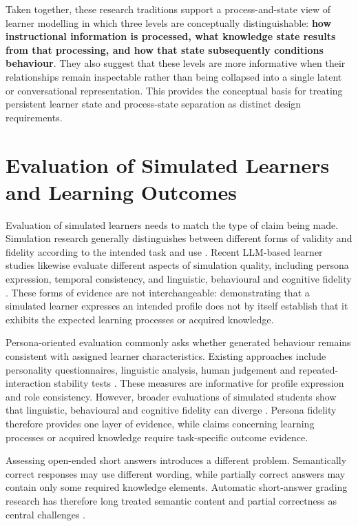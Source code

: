 Taken together, these research traditions support a process-and-state view of learner modelling in which three levels are conceptually distinguishable: \textbf{how instructional information is processed, what knowledge state results from that processing, and how that state subsequently conditions behaviour}. They also suggest that these levels are more informative when their relationships remain inspectable rather than being collapsed into a single latent or conversational representation. This provides the conceptual basis for treating persistent learner state and process-state separation as distinct design requirements.

\section{Evaluation of Simulated Learners and Learning Outcomes}
\label{sec:evaluation-related-work}

Evaluation of simulated learners needs to match the type of claim being made. Simulation research generally distinguishes between different forms of validity and fidelity according to the intended task and use \cite{harris-etal-2020-framework}. Recent LLM-based learner studies likewise evaluate different aspects of simulation quality, including persona expression, temporal consistency, and linguistic, behavioural and cognitive fidelity \cite{jiang-etal-2024-personallm,gonnermann-muller-etal-2026-adhd-persona,scarlatos-etal-2026-simulated}. These forms of evidence are not interchangeable: demonstrating that a simulated learner expresses an intended profile does not by itself establish that it exhibits the expected learning processes or acquired knowledge.

Persona-oriented evaluation commonly asks whether generated behaviour remains consistent with assigned learner characteristics. Existing approaches include personality questionnaires, linguistic analysis, human judgement and repeated-interaction stability tests \cite{jiang-etal-2024-personallm,gonnermann-muller-etal-2026-adhd-persona}. These measures are informative for profile expression and role consistency. However, broader evaluations of simulated students show that linguistic, behavioural and cognitive fidelity can diverge \cite{scarlatos-etal-2026-simulated}. Persona fidelity therefore provides one layer of evidence, while claims concerning learning processes or acquired knowledge require task-specific outcome evidence.

Assessing open-ended short answers introduces a different problem. Semantically correct responses may use different wording, while partially correct answers may contain only some required knowledge elements. Automatic short-answer grading research has therefore long treated semantic content and partial correctness as central challenges \cite{burrows-etal-2015-eras}.

